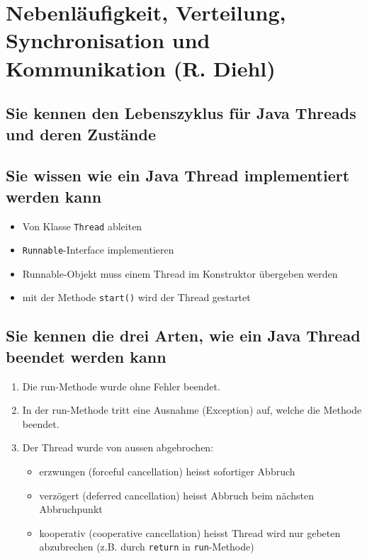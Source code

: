 \section{Nebenläufigkeit, Verteilung, Synchronisation und Kommunikation (R. Diehl)}
\label{sec:diehl}

\subsection{Sie kennen den Lebenszyklus für Java Threads und deren Zustände}


\subsection{Sie wissen wie ein Java Thread implementiert werden kann}

\begin{itemize}
	\item Von Klasse \texttt{Thread} ableiten
	\item \texttt{Runnable}-Interface implementieren
	\item Runnable-Objekt muss einem Thread im Konstruktor übergeben werden
	\item mit der Methode \texttt{start()} wird der Thread gestartet
\end{itemize}

\subsection{Sie kennen die drei Arten, wie ein Java Thread beendet werden kann}

\begin{enumerate}
	\item Die run-Methode wurde ohne Fehler beendet.
	\item In der run-Methode tritt eine Ausnahme (Exception) auf, welche die Methode beendet.
	\item Der Thread wurde von aussen abgebrochen:
	\begin{itemize}
		\item erzwungen (forceful cancellation) heisst sofortiger Abbruch
		\item verzögert (deferred cancellation) heisst Abbruch beim nächsten Abbruchpunkt
		\item kooperativ (cooperative cancellation) heisst Thread wird nur gebeten abzubrechen (z.B. durch \texttt{return} in \texttt{run}-Methode)
	\end{itemize}
\end{enumerate}

